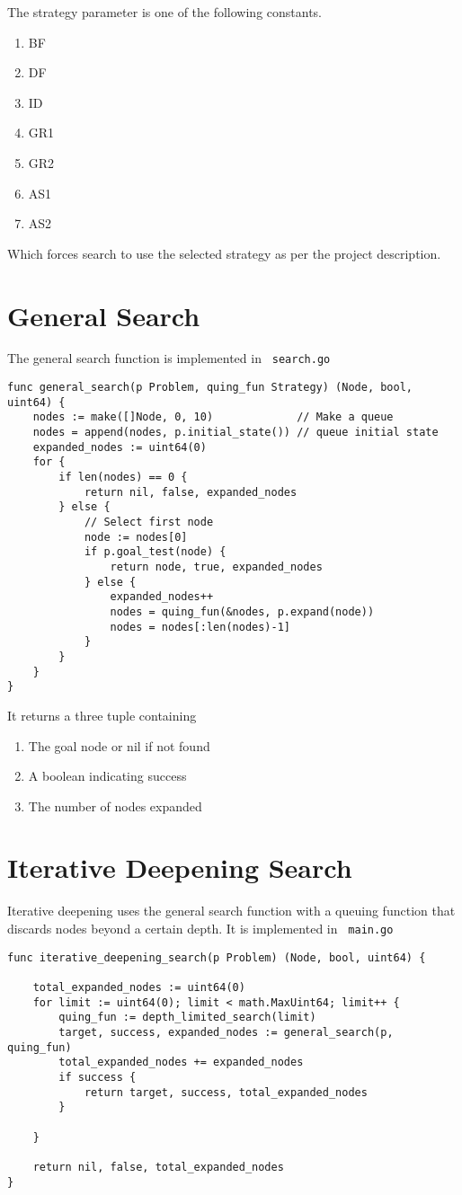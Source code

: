 \documentclass[14pt,a4paper]{report}
\begin{document}
The strategy parameter is one of the following constants.
\begin{enumerate}
\item BF
\item DF
\item ID
\item GR1
\item GR2
\item AS1
\item AS2
\end{enumerate}
Which forces search to use the selected strategy as per the project description.
\section{General Search}
The general search function is implemented in \verb+ search.go+
\begin{lstlisting}
func general_search(p Problem, quing_fun Strategy) (Node, bool, uint64) {
    nodes := make([]Node, 0, 10)             // Make a queue
    nodes = append(nodes, p.initial_state()) // queue initial state
    expanded_nodes := uint64(0)
    for {
        if len(nodes) == 0 {
            return nil, false, expanded_nodes
        } else {
            // Select first node
            node := nodes[0]
            if p.goal_test(node) {
                return node, true, expanded_nodes
            } else {
                expanded_nodes++
                nodes = quing_fun(&nodes, p.expand(node))
                nodes = nodes[:len(nodes)-1]
            }
        }
    }
}
\end{lstlisting}
It returns a three tuple containing
\begin{enumerate}
\item The goal node or nil if not found
\item A boolean indicating success
\item The number of nodes expanded
\end{enumerate}
\section{Iterative Deepening Search}
Iterative deepening uses the general search function with a queuing function that discards
nodes beyond a certain depth. It is implemented in \verb+ main.go +
\begin{lstlisting}
func iterative_deepening_search(p Problem) (Node, bool, uint64) {

    total_expanded_nodes := uint64(0)
    for limit := uint64(0); limit < math.MaxUint64; limit++ {
        quing_fun := depth_limited_search(limit)
        target, success, expanded_nodes := general_search(p, quing_fun)
        total_expanded_nodes += expanded_nodes
        if success {
            return target, success, total_expanded_nodes
        }

    }

    return nil, false, total_expanded_nodes
}
\end{lstlisting}
\end{document}
